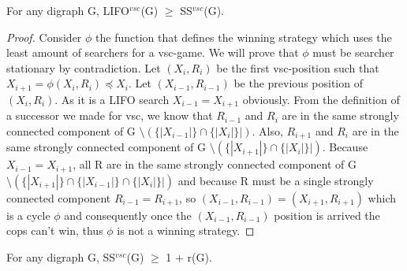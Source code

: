 \begin{lemma}
For any digraph G, LIFO$^{vsc}$(G) $\geq$ SS$^{vsc}$(G).
\end{lemma}
\begin{proof}
Consider $\phi$ the function that defines the winning strategy which uses the least amount of searchers for a vsc-game. We will prove that $\phi$ must be searcher stationary by contradiction. 
Let $(X_i, R_i)$ be the first vsc-position such that $X_{i+1} = \phi (X_i, R_i) \preceq X_i$. Let $(X_{i-1}, R_{i-1})$ be the previous position of $(X_i, R_i)$. As it is a LIFO search  $X_{i-1} = X_{i+1}$ obviously. From the definition of a successor we made for vsc, we know that  $R_{i-1}$ and $R_i$ are in the same strongly connected component of G $\setminus (\{|X_{i-1}|\} \cap \{|X_i|\}|)$. Also, $R_{i+1}$ and $R_i$ are in the same strongly connected component of G $\setminus (\{|X_{i+1}|\} \cap \{|X_i|\}|)$. Because $X_{i-1} = X_{i+1}$, all R are in the same strongly connected component of G $\setminus (\{|X_{i+1}|\} \cap \{|X_{i-1}|\} \cap \{|X_i|\}|)$ and because R must be a single strongly connected component $R_{i-1} = R_{i+1}$, so $(X_{i-1}, R_{i-1}) = (X_{i+1}, R_{i+1})$ which is a cycle $\phi$ and consequently once the $(X_{i-1}, R_{i-1})$ position is arrived the cops can't win, thus $\phi$ is not a winning strategy.
\end{proof}
\begin{lemma}
For any digraph G, SS$^{vsc}$(G) $\geq$ 1 + r(G).
\end{lemma}
